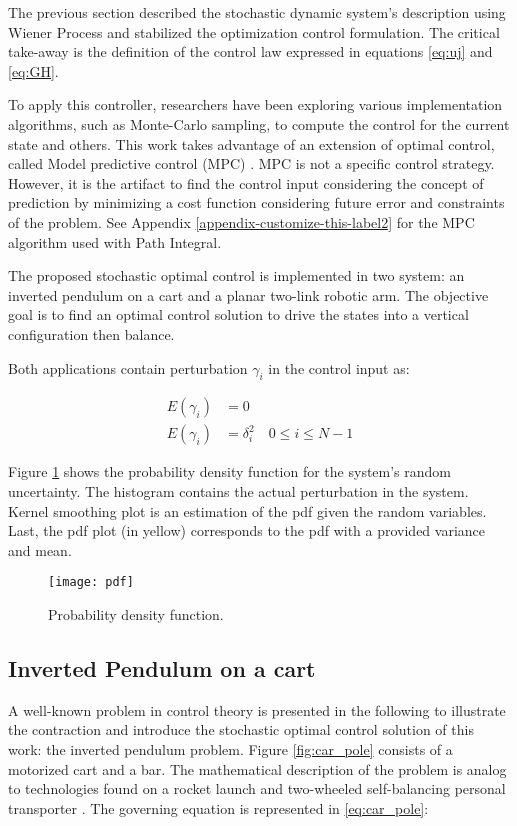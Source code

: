 \documentclass[]{hdsr}
\begin{document}
The previous section described the stochastic dynamic system's description using Wiener Process and stabilized the optimization control formulation. The critical take-away is the definition of the control law expressed in equations \ref{eq:uj} and \ref{eq:GH}.

To apply this controller, researchers have been exploring various implementation algorithms, such as  Monte-Carlo sampling, to compute the control for the current state \citep{kappen2005path} and others. This work takes advantage of an extension of optimal control, called Model predictive control (MPC) \citep{richter2011advanced}. MPC is not a specific control strategy. However, it is the artifact to find the control input considering the concept of prediction by minimizing a cost function considering future error and constraints of the problem. See Appendix \ref{appendix-customize-this-label2} for the MPC algorithm used with Path Integral.

The proposed stochastic optimal control is implemented in two system: an inverted pendulum on a cart and a planar two-link robotic arm. The objective goal is to find an optimal control solution to drive the states into a vertical configuration then balance.

Both applications contain perturbation $\gamma_i$ in the control input as: 

\begin{equation}
\begin{split}
    E(\gamma_i)&=0\\
    E(\gamma_i)&=\delta_i^2 \quad 0 \leqslant i \leqslant N-1 
\end{split}
\end{equation}

Figure \ref{fig:pdf} shows the probability density function for the system's random uncertainty. The histogram contains the actual perturbation in the system. Kernel smoothing plot is an estimation of the pdf given the random variables. Last, the pdf plot (in yellow) corresponds to the pdf with a provided variance and mean. 

\begin{figure}[H]
\centering
\texttt{[image: pdf]}
\caption{\label{fig:pdf}Probability density function.}
\end{figure}

\subsection{Inverted Pendulum on a cart}
A well-known problem in control theory is presented in the following to illustrate the contraction and introduce the stochastic optimal control solution of this work: the inverted pendulum problem. Figure \ref{fig:car_pole} consists of a motorized cart and a bar. The mathematical description of the problem is analog to technologies found on a rocket launch \citep{ogata2010modern} and two-wheeled self-balancing personal transporter \citep{chan2013review}. 
The governing equation is represented in \ref{eq:car_pole}:
\end{document}
